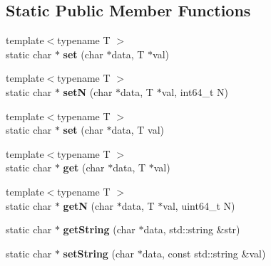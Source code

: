 \subsection*{Static Public Member Functions}
\begin{DoxyCompactItemize}
\item 
\mbox{\label{classraisim_1_1RaisimServer_a55d1f8192f1b9bde58569e2d3ed87542}} 
{\footnotesize template$<$typename T $>$ }\\static char $\ast$ {\bfseries set} (char $\ast$data, T $\ast$val)
\item 
\mbox{\label{classraisim_1_1RaisimServer_a48eba574f54645748331315ec2b6f4bf}} 
{\footnotesize template$<$typename T $>$ }\\static char $\ast$ {\bfseries setN} (char $\ast$data, T $\ast$val, int64\+\_\+t N)
\item 
\mbox{\label{classraisim_1_1RaisimServer_a39c33b596f0d9c70f2083c61b4950029}} 
{\footnotesize template$<$typename T $>$ }\\static char $\ast$ {\bfseries set} (char $\ast$data, T val)
\item 
\mbox{\label{classraisim_1_1RaisimServer_a9ba61a401b7a4d080dfb9761f4d8c1ce}} 
{\footnotesize template$<$typename T $>$ }\\static char $\ast$ {\bfseries get} (char $\ast$data, T $\ast$val)
\item 
\mbox{\label{classraisim_1_1RaisimServer_a1c92a5358e5230fb71d73846d0079357}} 
{\footnotesize template$<$typename T $>$ }\\static char $\ast$ {\bfseries getN} (char $\ast$data, T $\ast$val, uint64\+\_\+t N)
\item 
\mbox{\label{classraisim_1_1RaisimServer_ab11d3b521795c55ef01a9ff27d81cc02}} 
static char $\ast$ {\bfseries get\+String} (char $\ast$data, std\+::string \&str)
\item 
\mbox{\label{classraisim_1_1RaisimServer_a45e949c8ffb5d79cd4d7a944bcb6fd71}} 
static char $\ast$ {\bfseries set\+String} (char $\ast$data, const std\+::string \&val)

\end{DoxyCompactItemize}
